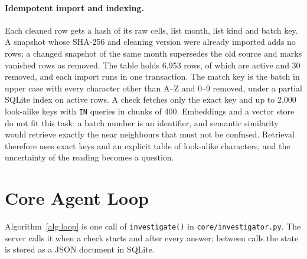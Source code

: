 \paragraph{Idempotent import and indexing.} Each cleaned row gets a hash of its raw cells, list month, list kind and batch key. A snapshot whose SHA-256 and cleaning version were already imported adds no rows; a changed snapshot of the same month supersedes the old source and marks vanished rows as removed. The table holds 6{,}953 rows, of which \ResAlertCount{} are active and 30 removed, and each import runs in one transaction. The match key is the batch in upper case with every character other than A--Z and 0--9 removed, under a partial SQLite index on active rows. A check fetches only the exact key and up to 2{,}000 look-alike keys with \texttt{IN} queries in chunks of 400. Embeddings and a vector store do not fit this task: a batch number is an identifier, and semantic similarity would retrieve exactly the near neighbours that must not be confused. Retrieval therefore uses exact keys and an explicit table of look-alike characters, and the uncertainty of the reading becomes a question.

\section{Core Agent Loop}
\label{sec:impl-core-agent-loop}

Algorithm~\ref{alg:loop} is one call of \texttt{investigate()} in \texttt{core/investigator.py}. The server calls it when a check starts and after every answer; between calls the state is stored as a JSON document in SQLite.

